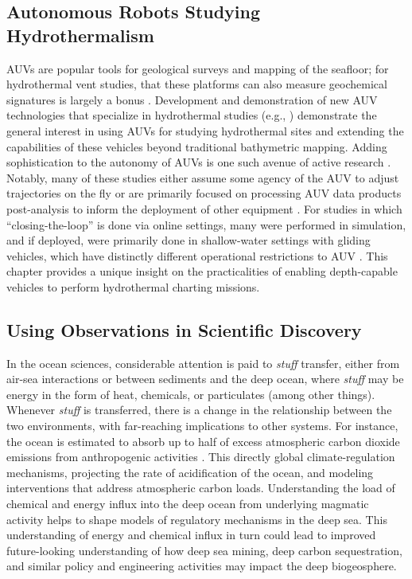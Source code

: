 \subsection{Autonomous Robots Studying Hydrothermalism}
AUVs are popular tools for geological surveys and mapping of the seafloor; for hydrothermal vent studies, that these platforms can also measure geochemical signatures is largely a bonus \autocite{clague2008abundance,kumagai2010hydrothermal,kinsey2011assessing,ryan2011high,caratori2012crustal,baker2019posteruption,mcphail2010challenges,schmid2019physico}. Development and demonstration of new AUV technologies that specialize in hydrothermal studies (e.g., \cite{maki2014auv,okamoto2019visual}) demonstrate the general interest in using AUVs for studying hydrothermal sites and extending the capabilities of these vehicles beyond traditional bathymetric mapping. Adding sophistication to the autonomy of AUVs is one such avenue of active research \autocite{branch2020demonstration,wang20203,mason2020evaluation,saigol2009information}. Notably, many of these studies either assume some agency of the AUV to adjust trajectories on the fly \autocite{branch2020demonstration,wang20203,saigol2009information} or are primarily focused on processing AUV data products post-analysis to inform the deployment of other equipment \autocite{jakuba2008autonomous}. For studies in which ``closing-the-loop'' is done via online settings, many were performed in simulation, and if deployed, were primarily done in shallow-water settings with gliding vehicles, which have distinctly different operational restrictions to AUV \Sentry. This chapter provides a unique insight on the practicalities of enabling depth-capable vehicles to perform hydrothermal charting missions.

\subsection{Using Observations in Scientific Discovery}
In the ocean sciences, considerable attention is paid to \emph{stuff} transfer, either from air-sea interactions or between sediments and the deep ocean, where \emph{stuff} may be energy in the form of heat, chemicals, or particulates (among other things). Whenever \emph{stuff} is transferred, there is a change in the relationship between the two environments, with far-reaching implications to other systems. For instance, the ocean is estimated to absorb up to half of excess atmospheric carbon dioxide emissions from anthropogenic activities \autocite{hori2019blue,raven2005ocean}. This directly global climate-regulation mechanisms, projecting the rate of acidification of the ocean, and modeling interventions that address atmospheric carbon loads. Understanding the load of chemical and energy influx into the deep ocean from underlying magmatic activity helps to shape models of regulatory mechanisms in the deep sea. This understanding of energy and chemical influx in turn could lead to improved future-looking understanding of how deep sea mining, deep carbon sequestration, and similar policy and engineering activities may impact the deep biogeosphere.

